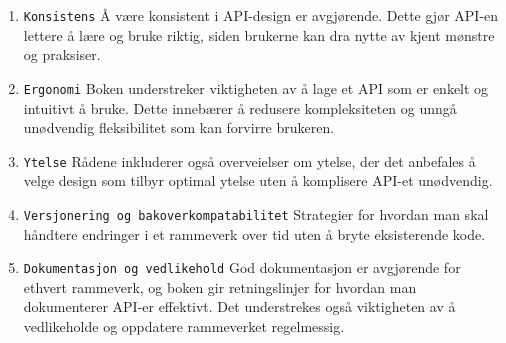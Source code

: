 \documentclass[12pt]{article}
\begin{document}
\begin{enumerate}
    \item \texttt{Konsistens}
    Å være konsistent i API-design er avgjørende. 
    Dette gjør API-en lettere å lære og bruke riktig, siden brukerne kan dra nytte av kjent mønstre og praksiser.
    \item \texttt{Ergonomi}
    Boken understreker viktigheten av å lage et API som er enkelt og intuitivt å bruke. 
    Dette innebærer å redusere kompleksiteten og unngå unødvendig fleksibilitet som kan forvirre brukeren.
    \item \texttt{Ytelse}
    Rådene inkluderer også overveielser om ytelse, 
    der det anbefales å velge design som tilbyr optimal ytelse uten å komplisere API-et unødvendig.
    \item \texttt{Versjonering og bakoverkompatabilitet}
    Strategier for hvordan man skal håndtere endringer i et rammeverk over tid uten å bryte eksisterende kode.
    \item \texttt{Dokumentasjon og vedlikehold}
    God dokumentasjon er avgjørende for ethvert rammeverk, og boken gir retningslinjer for hvordan man dokumenterer API-er effektivt. 
    Det understrekes også viktigheten av å vedlikeholde og oppdatere rammeverket regelmessig.
\end{enumerate}
\end{document}
